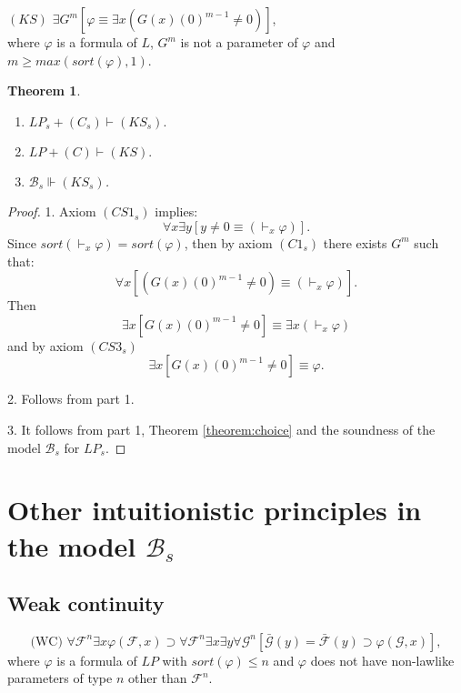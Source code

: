 \documentclass{asl}
\newtheorem{theorem}{Theorem}[section]
\theoremstyle{definition}
\begin{document}
$ (KS) $ \qquad   $\exists G^m \left[ \varphi \equiv \exists x\left( G(x)(0)^{m-1}\neq 0\right) \right] $,
\\where $ \varphi $ is a formula of $L$, $ G^m $ is not a parameter of $\varphi $ and $ m\geqslant max(sort(\varphi),1)$.
\begin{theorem}
\begin{enumerate}
\item  $ LP_s+(C_s)\vdash (KS_s). $ 
\item  $ LP+(C)\vdash (KS). $ 
\item $\mathcal{B}_s \Vdash (KS_s)$.
\end{enumerate}
\label{theorem:Kripke1}
\end{theorem}
\begin{proof}
1. Axiom $(CS1_s)$ implies:
\[ \forall x\exists y \left[y\neq 0 \equiv (\vdash _x\varphi)\right]. \]
Since $sort(\vdash _x\varphi)=sort(\varphi)$, then by axiom $(C1_s)$ there exists $G^m$ such that:
\[\forall x \left[\left(G(x)(0)^{m-1} \neq 0\right) \equiv (\vdash _x\varphi) \right].  \]
Then 
\[\exists x \left[G(x)(0)^{m-1} \neq 0\right] \equiv \exists x(\vdash _x\varphi)\]
and by axiom $(CS3_s)$
\[\exists x \left[G(x)(0)^{m-1} \neq 0\right] \equiv \varphi.\]

2. Follows from part 1.

3. It follows from part 1, Theorem \ref{theorem:choice} and the soundness of the model $\mathcal{B}_s$ for $ LP_s $.
\end{proof}

\section{Other intuitionistic principles in the model $\mathcal{B}_s$}

\subsection{Weak continuity}
\[\text{(WC)    } \forall \mathcal{F}^n \exists x \varphi(\mathcal{F},x) \supset  \forall \mathcal{F}^n \exists x \exists y\forall\mathcal{G}^n [ \mathcal{\bar{G}}(y)=\mathcal{\bar{F}}(y) \supset\varphi(\mathcal{G},x)],\]
where $ \varphi $ is a formula of $ LP $ with $sort(\varphi) \leqslant n$ and $\varphi$ does not have non-lawlike parameters of type $n$ other than $\mathcal{F}^n$.
\smallskip
\end{document}
